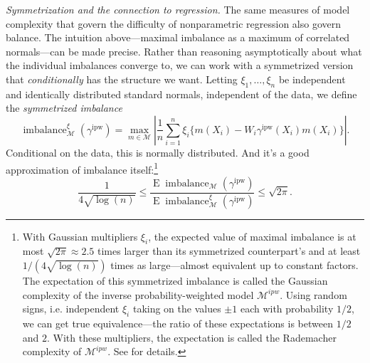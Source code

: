 \documentclass{article}
\newcommand{\paragraph}[1]{\par\noindent\textit{#1}\enspace}
\theoremstyle{definition}
\DeclareMathOperator{\E}{E}
\newcommand{\ipw}{\text{ipw}}
\DeclareMathOperator{\imbalance}{imbalance}
\newcommand{\gammaipw}{\ensuremath{\gamma^{\ipw}}}
\newcommand{\model}{\mathcal{M}}
\newcommand{\<}{\langle}
\renewcommand{\>}{\rangle}
\begin{document}
\paragraph{Symmetrization and the connection to regression.}
The same measures of model complexity that govern the difficulty of nonparametric regression also govern balance. The intuition above---maximal imbalance as a maximum of correlated normals---can be made precise. Rather than reasoning asymptotically about what the individual imbalances converge to, we can work with a symmetrized version that \emph{conditionally} has the structure we want. Letting $\xi_1, \ldots, \xi_n$ be independent and identically distributed standard normals, independent of the data, we define the \emph{symmetrized imbalance}
\begin{equation}
  \label{eq:ipw_gen_imbalance_symmetrized}
  \imbalance^\xi_{\model}(\gammaipw) = \max_{m \in \model} \left| \frac{1}{n}\sum_{i=1}^n \xi_i \{ m(X_i) -  W_i \gammaipw(X_i) m(X_i) \}\right|.
\end{equation}
Conditional on the data, this is normally distributed. And it's a good approximation of imbalance itself:\footnote{With Gaussian multipliers $\xi_i$, the expected value of maximal imbalance is at most  $\sqrt{2\pi}\approx 2.5$ times larger than
its symmetrized counterpart's and at least $1/(4\sqrt{\log(n)})$ times as large---almost equivalent up to constant factors. The expectation of this symmetrized imbalance is called the Gaussian complexity of the inverse probability-weighted model
$\model^{ipw}$. Using random signs, i.e. independent $\xi_i$ taking on the values $\pm 1$ each with probability $1/2$,
we can get true equivalence---the ratio of these expectations is between $1/2$ and $2$.  With these multipliers, the expectation is called the Rademacher complexity of $\model^{ipw}$. See \citet{bartlett2002rademacher} for details.}
\begin{equation}
  \label{eq:symmetrization-bounds}
   \frac{1}{4\sqrt{\log(n)}} \le \frac{\E \imbalance_{\model}(\gammaipw)}{\E \imbalance^\xi_{\model}(\gammaipw)} \le \sqrt{2\pi}.
\end{equation}
\end{document}
